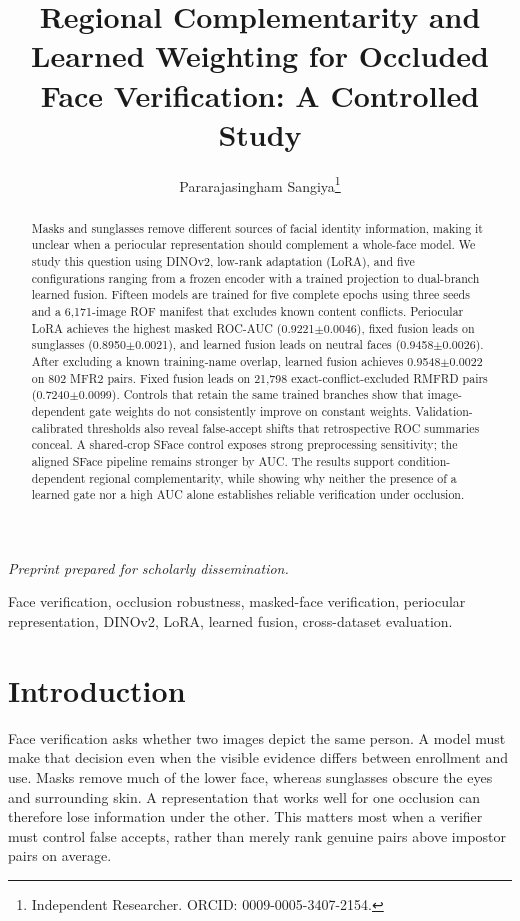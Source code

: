 \documentclass[10pt,journal,compsoc]{IEEEtran}
\title{Regional Complementarity and Learned Weighting for Occluded Face Verification: A Controlled Study}
\author{Pararajasingham Sangiya\thanks{Independent Researcher. ORCID: 0009-0005-3407-2154.}}
\begin{document}
\maketitle
\noindent\textit{Preprint prepared for scholarly dissemination.}\par
\begin{abstract}
Masks and sunglasses remove different sources of facial identity information, making it unclear when a periocular representation should complement a whole-face model. We study this question using DINOv2, low-rank adaptation (LoRA), and five configurations ranging from a frozen encoder with a trained projection to dual-branch learned fusion. Fifteen models are trained for five complete epochs using three seeds and a 6,171-image ROF manifest that excludes known content conflicts. Periocular LoRA achieves the highest masked ROC-AUC (0.9221$\pm$0.0046), fixed fusion leads on sunglasses (0.8950$\pm$0.0021), and learned fusion leads on neutral faces (0.9458$\pm$0.0026). After excluding a known training-name overlap, learned fusion achieves 0.9548$\pm$0.0022 on 802 MFR2 pairs. Fixed fusion leads on 21,798 exact-conflict-excluded RMFRD pairs (0.7240$\pm$0.0099). Controls that retain the same trained branches show that image-dependent gate weights do not consistently improve on constant weights. Validation-calibrated thresholds also reveal false-accept shifts that retrospective ROC summaries conceal. A shared-crop SFace control exposes strong preprocessing sensitivity; the aligned SFace pipeline remains stronger by AUC. The results support condition-dependent regional complementarity, while showing why neither the presence of a learned gate nor a high AUC alone establishes reliable verification under occlusion.

\end{abstract}
\begin{IEEEkeywords}
Face verification, occlusion robustness, masked-face verification, periocular representation, DINOv2, LoRA, learned fusion, cross-dataset evaluation.
\end{IEEEkeywords}

\section{Introduction}
Face verification asks whether two images depict the same person. A model must make that decision even when the visible evidence differs between enrollment and use. Masks remove much of the lower face, whereas sunglasses obscure the eyes and surrounding skin. A representation that works well for one occlusion can therefore lose information under the other. This matters most when a verifier must control false accepts, rather than merely rank genuine pairs above impostor pairs on average.
\end{document}
